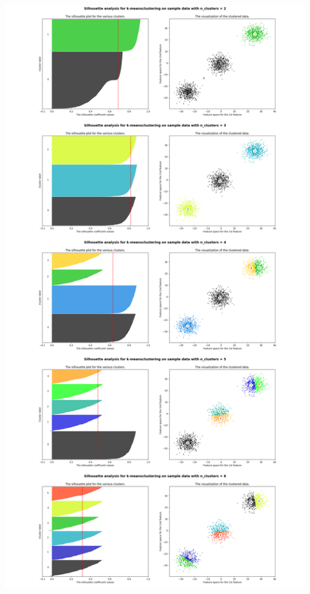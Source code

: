 \documentclass[11pt]{article}
\makeatletter
\def\maxwidth{\ifdim\Gin@nat@width>\linewidth\linewidth
    \else\Gin@nat@width\fi}
\let\Oldincludegraphics\includegraphics
\renewcommand{\includegraphics}[1]{\Oldincludegraphics[width=.8\maxwidth]{#1}}
\makeatother
\begin{document}
\begin{center}
	\resizebox{10cm}{!} {\includegraphics{../images/clustersScore.png}}
\end{center}
\end{document}
